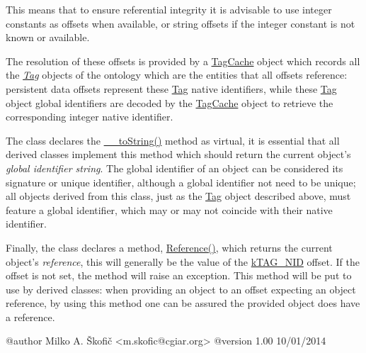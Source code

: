 This means that to ensure referential integrity it is advisable to use integer constants as offsets when available, or string offsets if the integer constant is not known or available.

The resolution of these offsets is provided by a \hyperlink{class_ontology_wrapper_1_1_tag_cache}{Tag\-Cache} object which records all the {\itshape \hyperlink{class_ontology_wrapper_1_1_tag}{Tag}} objects of the ontology which are the entities that all offsets reference\-: persistent data offsets represent these \hyperlink{class_ontology_wrapper_1_1_tag}{Tag} native identifiers, while these \hyperlink{class_ontology_wrapper_1_1_tag}{Tag} object global identifiers are decoded by the \hyperlink{class_ontology_wrapper_1_1_tag_cache}{Tag\-Cache} object to retrieve the corresponding integer native identifier.

The class declares the \hyperlink{class_ontology_wrapper_1_1_ontology_object_aa3f8d87842ea2c3a50b3e760adb2224f}{\-\_\-\-\_\-to\-String()} method as virtual, it is essential that all derived classes implement this method which should return the current object's {\itshape global identifier string}. The global identifier of an object can be considered its signature or unique identifier, although a global identifier not need to be unique; all objects derived from this class, just as the \hyperlink{class_ontology_wrapper_1_1_tag}{Tag} object described above, must feature a global identifier, which may or may not coincide with their native identifier.

Finally, the class declares a method, \hyperlink{class_ontology_wrapper_1_1_ontology_object_a28e1502b1cc43e05c07d854e79780e9c}{Reference()}, which returns the current object's {\itshape reference}, this will generally be the value of the \hyperlink{}{k\-T\-A\-G\-\_\-\-N\-I\-D} offset. If the offset is not set, the method will raise an exception. This method will be put to use by derived classes\-: when providing an object to an offset expecting an object reference, by using this method one can be assured the provided object does have a reference. \begin{DoxyVerb} @author            Milko A. Škofič <m.skofic@cgiar.org>
 @version   1.00 10/01/2014\end{DoxyVerb}
 

